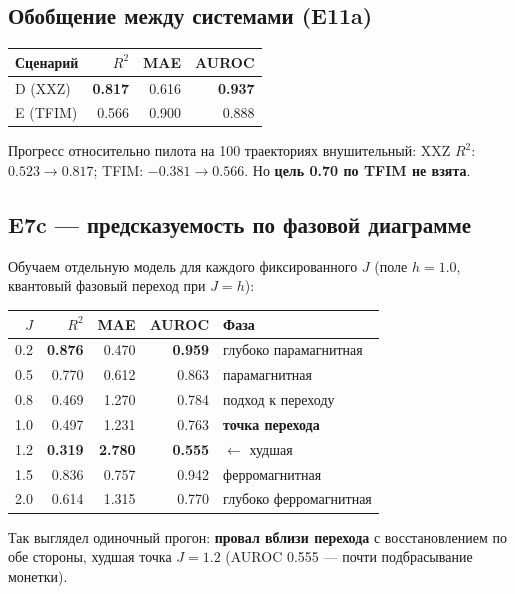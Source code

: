 \documentclass[12pt,a4paper]{article}
\begin{document}
\subsection{Обобщение между системами (E11a)}

\begin{center}
\begin{tabular}{@{}lrrr@{}}
\toprule
Сценарий & $R^2$ & MAE & AUROC \\
\midrule
D (XXZ) & \textbf{0.817} & 0.616 & \textbf{0.937} \\
E (TFIM) & 0.566 & 0.900 & 0.888 \\
\bottomrule
\end{tabular}
\end{center}

Прогресс относительно пилота на 100 траекториях внушительный: XXZ $R^2$:
$0.523\to 0.817$; TFIM: $-0.381\to 0.566$. Но \textbf{цель 0.70 по TFIM не
взята}.

\subsection{E7c — предсказуемость по фазовой диаграмме}

Обучаем отдельную модель для каждого фиксированного $J$ (поле $h=1.0$,
квантовый фазовый переход при $J=h$):

\begin{center}
\begin{tabular}{@{}rrrrl@{}}
\toprule
$J$ & $R^2$ & MAE & AUROC & Фаза \\
\midrule
0.2 & \textbf{0.876} & 0.470 & \textbf{0.959} & глубоко парамагнитная \\
0.5 & 0.770 & 0.612 & 0.863 & парамагнитная \\
0.8 & 0.469 & 1.270 & 0.784 & подход к переходу \\
1.0 & 0.497 & 1.231 & 0.763 & \textbf{точка перехода} \\
1.2 & \textbf{0.319} & \textbf{2.780} & \textbf{0.555} & $\leftarrow$ худшая \\
1.5 & 0.836 & 0.757 & 0.942 & ферромагнитная \\
2.0 & 0.614 & 1.315 & 0.770 & глубоко ферромагнитная \\
\bottomrule
\end{tabular}
\end{center}

Так выглядел одиночный прогон: \textbf{провал вблизи перехода} с
восстановлением по обе стороны, худшая точка $J=1.2$ (AUROC 0.555 — почти
подбрасывание монетки).
\end{document}
